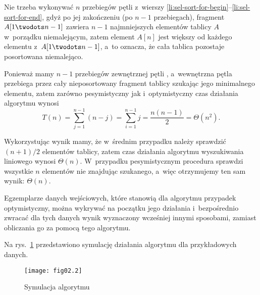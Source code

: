 Nie trzeba wykonywać $n$ przebiegów pętli  z~wierszy \ref{li:sel-sort-for-begin}\nobreakdash--\ref{li:sel-sort-for-end}, gdyż po jej zakończeniu (po $n-1$ przebiegach), fragment $A[1\twodots n-1]$ zawiera $n-1$ najmniejszych elementów tablicy $A$ w~porządku niemalejącym, zatem element $A[n]$ jest większy od każdego elementu z~$A[1\twodots n-1]$, a~to oznacza, że cała tablica pozostaje posortowana niemalejąco.

Ponieważ mamy $n-1$ przebiegów zewnętrznej pętli , a~wewnętrzna pętla  przebiega przez cały nieposortowany fragment tablicy szukając jego minimalnego elementu, zatem zarówno pesymistyczny jak i~optymistyczny czas działania algorytmu wynosi
\[
	T(n) = \sum_{j=1}^{n-1}(n-j) = \sum_{i=1}^{n-1}j = \frac{n(n-1)}{2} = \Theta(n^2).
\]

\exercise %
Wykorzystując wynik  mamy, że w~średnim przypadku należy sprawdzić $(n+1)/2$ elementów tablicy, zatem czas działania algorytmu wyszukiwania liniowego wynosi $\Theta(n)$. W~przypadku pesymistycznym procedura sprawdzi wszystkie $n$ elementów nie znajdując szukanego, a~więc otrzymujemy ten sam wynik: $\Theta(n)$.

\exercise %
Egzemplarze danych wejściowych, które stanowią dla algorytmu przypadek optymistyczny, można wykrywać na początku jego działania i~bezpośrednio zwracać dla tych danych wynik wyznaczony wcześniej innymi sposobami, zamiast obliczania go za pomocą tego algorytmu.


\exercise %
Na rys.~\ref{fig:2.3-1} przedstawiono symulację działania algorytmu  dla przykładowych danych.
\begin{figure}[!ht]
	\begin{center}
		\texttt{[image: fig02.2]}
	\end{center}
	\caption{Symulacja algorytmu } \label{fig:2.3-1}
\end{figure}

